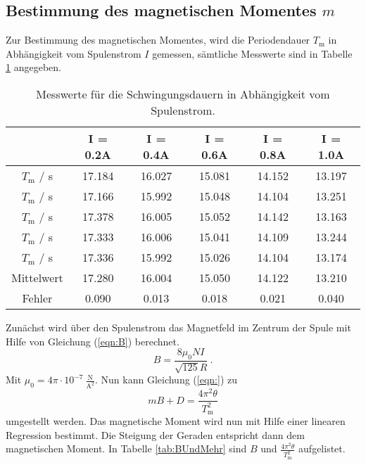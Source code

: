 \subsection{Bestimmung des magnetischen Momentes $m$}
Zur Bestimmung des magnetischen Momentes, wird die Periodendauer $T_\text{m}$ in Abhängigkeit vom Spulenstrom $I$ gemessen, sämtliche Messwerte sind in Tabelle \ref{tab:Periodendauer3} angegeben.

\begin{table}[H] %
  \centering
  \begin{tabular}{c | c | c | c | c | c}
    & I = 0.2A & I = 0.4A & I = 0.6A & I = 0.8A & I = 1.0A \\
    \midrule
    $T_\text{m}$ / s & 17.184 & 16.027 & 15.081 & 14.152 & 13.197 \\
    $T_\text{m}$ / s & 17.166 & 15.992 & 15.048 & 14.104 & 13.251 \\
    $T_\text{m}$ / s & 17.378 & 16.005 & 15.052 & 14.142 & 13.163 \\
    $T_\text{m}$ / s & 17.333 & 16.006 & 15.041 & 14.109 & 13.244 \\
    $T_\text{m}$ / s & 17.336 & 15.992 & 15.026 & 14.104 & 13.174 \\
    \bottomrule
    Mittelwert & 17.280 & 16.004 & 15.050 & 14.122 & 13.210 \\
    Fehler & 0.090 & 0.013 & 0.018 & 0.021 & 0.040 \\
    \bottomrule
  \end{tabular}
  \caption{Messwerte für die Schwingungsdauern in Abhängigkeit vom Spulenstrom.}
  \label{tab:Periodendauer3}
\end{table}

Zunächst wird über den Spulenstrom das Magnetfeld im Zentrum der Spule mit Hilfe von Gleichung (\ref{eqn:B}) berechnet.
\begin{equation}
  B = \frac{8 \mu_0 N I}{\sqrt{125}R} \ .
  \label{eqn:B}
\end{equation}
Mit $\mu_0 = 4 \pi \cdot 10^{-7} \ \frac{\text{N}}{\text{A}^2}$.
Nun kann Gleichung (\ref{eqn:}) zu
\begin{equation}
  mB + D = \frac{4 \pi^2 \theta}{T_\text{m}^2}
\end{equation}
umgestellt werden. Das magnetische Moment wird nun mit Hilfe einer linearen Regression bestimmt. Die Steigung der Geraden entspricht dann dem magnetischen Moment. In Tabelle \ref{tab:BUndMehr} sind $B$ und $\frac{4 \pi^2 \theta}{T_\text{m}^2}$ aufgelistet.

